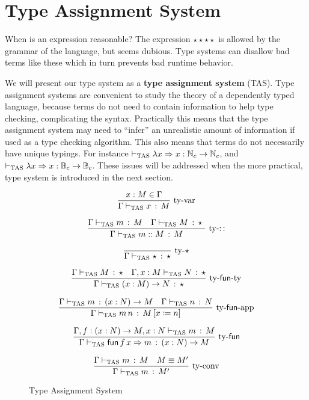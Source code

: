 \section{\SLang{} Type Assignment System}
 
When is an expression reasonable? The expression $\star\star\star\star$ is allowed by the grammar of the language, but seems dubious.
Type systems can disallow bad terms like these which in turn prevents bad runtime behavior.
 
We will present our type system as a \textbf{type assignment system} (\ac{TAS}).
Type assignment systems are convenient to study the theory of a dependently typed language, because terms do not need to contain information to help type checking, complicating the syntax. %
Practically this means that the type assignment system may need to ``infer'' an unrealistic amount of information if used as a type checking algorithm.
This also means that terms do not necessarily have unique typings.
For instance $\vdash_{\mathrm{TAS}}\lambda x\Rightarrow x:\mathbb{N}_{c}\rightarrow\mathbb{N}_{c}$, and $\vdash_{\mathrm{TAS}}\lambda x\Rightarrow x:\mathbb{B}_{c}\rightarrow\mathbb{B}_{c}$.
These issues will be addressed when the more practical, \bidir{} type system is introduced in the next section.
 
\begin{figure}
\[
\frac{x:M\in\Gamma}{\Gamma\vdash_{\mathrm{TAS}} x\,:\,M}\,\operatorname{ty-var}
\]
 
\[
\frac{\Gamma\vdash_{\mathrm{TAS}} m\,:\,M \quad \Gamma\vdash_{\mathrm{TAS}} M\,:\,\star\
}{\Gamma\vdash_{\mathrm{TAS}} m::M\,:\,M}
\,\operatorname{ty-::}
\]
 
\[
\frac{{\color{gray}\ }}{\Gamma\tasys\star\,:\,\star}\,\rulename{ty-\star}
\]
 
\[
\frac{\Gamma\vdash_{\mathrm{TAS}} M\,:\,\star\quad\Gamma,x:M\vdash_{\mathrm{TAS}} N\,:\,\star}{\Gamma\vdash_{\mathrm{TAS}}\left(x:M\right)\rightarrow N\,:\,\star}\,\operatorname{ty-\mathsf{fun}-ty}
\]
 
\[
\frac{\Gamma\vdash_{\mathrm{TAS}} m\,:\,\left(x:N\right)\rightarrow M\quad\Gamma\vdash_{\mathrm{TAS}} n\,:\,N}{\Gamma\vdash_{\mathrm{TAS}} m\,n\,:\,M\left[x\coloneqq n\right]}\,\operatorname{ty-\mathsf{fun}-app}
\]
 
\[
\frac{\Gamma,f:\left(x:N\right)\rightarrow M,x:N\vdash_{\mathrm{TAS}} m\,:\,M}{\Gamma\vdash_{\mathrm{TAS}}\mathsf{fun}\,f\,x\Rightarrow m\,:\,\left(x:N\right)\rightarrow M}\,\operatorname{ty-\mathsf{fun}}
\]
 
\[
\frac{\Gamma\vdash_{\mathrm{TAS}} m\,:\,M\quad M\equiv M'}{\Gamma\vdash_{\mathrm{TAS}} m\,:\,M'}\,\operatorname{ty-conv}
\]
 
\caption{\SLang{} Type Assignment System}
\label{fig:surface-TAS}
\end{figure}
 
